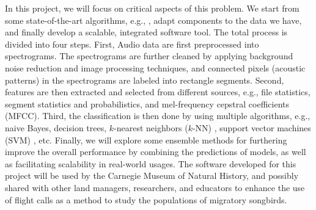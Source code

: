 \documentclass[12pt,peerreview,letterpaper]{IEEEtran}
\begin{document}
In this project, we will focus on critical aspects of this problem. We start from some state-of-the-art algorithms, e.g., \cite{mlsp2,chennovel13,briggs2013instance,Lasseck13,Massaron13,stattnersong13}, adapt components to the data we have, and finally develop a scalable, integrated software tool. The total process is divided into four steps. First, Audio data are first preprocessed into spectrograms. The spectrograms are further cleaned by applying background noise reduction and image processing techniques, and connected pixels (acoustic patterns) in the spectrograms are labeled into rectangle segments. Second, features are then extracted and selected from different sources, e.g., file statistics, segment statistics and probabilistics, and mel-frequency cepstral coefficients (MFCC). Third, the classification is then done by using multiple algorithms, e.g., naive Bayes, decision trees, $k$-nearest neighbors ($k$-NN) \cite{cover1967nearest}, support vector machines (SVM) \cite{cortes1995support}, etc. Finally, we will explore some ensemble methods \cite{breiman2001random,breiman1996bagging,freund1997decision,hoeting1999bayesian,read2011classifier} for furthering improve the overall performance by combining the predictions of models, as well as facilitating scalability in real-world usages. The software developed for this project will be used by the Carnegie Museum of Natural History, and possibly shared with other land managers, researchers, and educators to enhance the use of flight calls as a method to study the populations of migratory songbirds.

%


\end{document}
